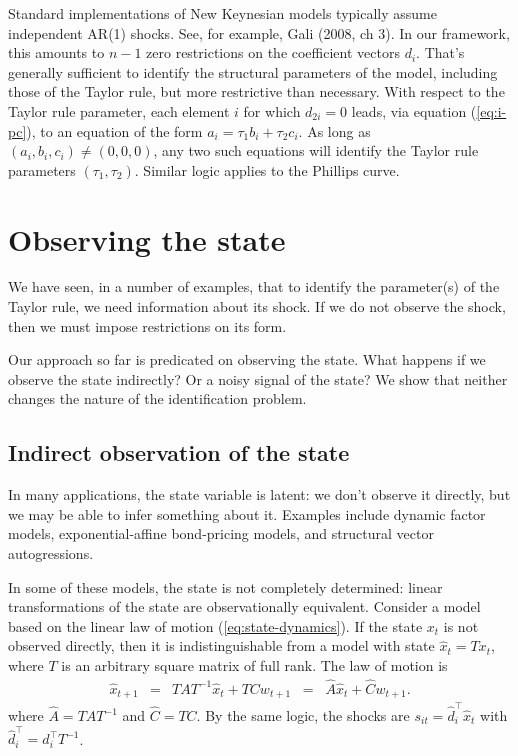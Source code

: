 \documentclass[11pt]{article}
\begin{document}
{Standard implementations of New Keynesian models typically assume
independent AR(1) shocks.
See, for example, Gali (2008, ch 3).
In our framework, this amounts to $n-1$ zero restrictions on the coefficient vectors $d_i$.
That's generally sufficient to identify the structural parameters of the model,
including those of the Taylor rule,
but more restrictive than necessary.
With respect to the Taylor rule parameter,
each element $i$ for which $d_{2i}=0$ leads,
via equation (\ref{eq:i-pc}),
to an equation of the form $a_i = \tau_1 b_i + \tau_2 c_i$.
As long as $(a_i,b_i,c_i) \neq (0,0,0)$, any two such equations will
identify the Taylor rule parameters $(\tau_1,\tau_2)$.
Similar logic applies to the Phillips curve.


\section{Observing the state}
\label{sec:observability}

We have seen, in a number of examples, that to identify the parameter(s) of the Taylor rule,
we need information about its shock.
If we do not observe the shock, then we must impose restrictions on its form.

Our approach so far is predicated on observing the state.
What happens if we observe the state indirectly?
Or a noisy signal of the state?
We show that neither changes the nature of the identification problem.


\subsection{Indirect observation of the state}

In many applications, the state variable is latent:
we don't observe it directly,
but we may be able to infer something about it.
Examples include dynamic factor models,
exponential-affine bond-pricing models,
and structural vector autogressions.

In some of these models, the state is not completely determined:
linear transformations of the state are observationally equivalent.
Consider a model based on the linear law of motion (\ref{eq:state-dynamics}).
If the state $x_t$ is not observed directly, then it is indistinguishable
from a model with state $\hat{x}_t = T x_t$,
where $T$ is an arbitrary square matrix of full rank.
The law of motion is
\begin{eqnarray}
    \hat{x}_{t+1} &=& T A T^{-1} \hat{x}_t + T C w_{t+1}
            \;\;=\;\; \widehat{A} \hat{x}_t + \widehat{C} w_{t+1} .
    \label{eq:state-dynamics-transformed}
\end{eqnarray}
where $\widehat{A} = T A T^{-1}$ and $\widehat{C} = T C$.
By the same logic,
the shocks are $ s_{it} = \hat{d}_i^{\top} \hat{x}_t$ with
$ \hat{d}_i^{\top} = {d}_i^\top T^{-1} $.


}
\end{document}
